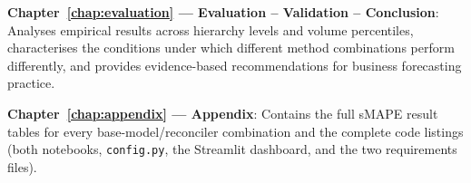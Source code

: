 \textbf{Chapter~\ref{chap:evaluation} — Evaluation – Validation – Conclusion}: Analyses empirical results across hierarchy levels and volume percentiles, characterises the conditions under which different method combinations perform differently, and provides evidence-based recommendations for business forecasting practice.

\textbf{Chapter~\ref{chap:appendix} — Appendix}: Contains the full sMAPE result tables for every base-model/reconciler combination and the complete code listings (both notebooks, \texttt{config.py}, the Streamlit dashboard, and the two requirements files).


% 